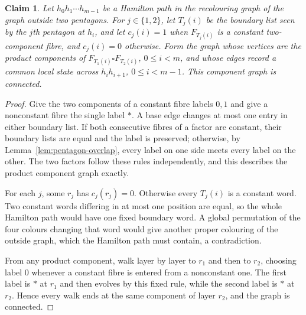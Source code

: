 \documentclass[11pt]{article}
\newtheorem{claim}{Claim}
\theoremstyle{remark}
\numberwithin{equation}{section}
\numberwithin{table}{section}
\begin{document}
\begin{claim}\label{lem:pentagon-component-graph}
Let $h_0h_1\cdots h_{m-1}$ be a Hamilton path in the
recolouring graph of the graph outside two pentagons.  For
$j\in\{1,2\}$, let $T_j(i)$ be the boundary list seen by the $j$th
pentagon at $h_i$, and let $c_j(i)=1$ when $F_{T_j(i)}$ is a constant
two-component fibre, and $c_j(i)=0$ otherwise.  Form the graph whose
vertices are the product components of
$F_{T_1(i)}\square F_{T_2(i)}$, $0\le i<m$, and whose edges record a
common local state across $h_ih_{i+1}$, $0\le i<m-1$.  This component
graph is connected.
\end{claim}
\begin{proof}
Give the two components of a constant fibre labels $0,1$ and give a
nonconstant fibre the single label $\ast$.  A base edge changes at
most one entry in either boundary list.  If both consecutive fibres of
a factor are constant, their boundary lists are equal and the label is
preserved; otherwise, by Lemma~\ref{lem:pentagon-overlap}, every label
on one side meets every label on the other.  The two factors follow
these rules independently, and this describes the product component
graph exactly.

For each $j$, some $r_j$ has $c_j(r_j)=0$.  Otherwise every $T_j(i)$
is a constant word.  Two constant words differing in at most one
position are equal, so the whole Hamilton path would have one fixed
boundary word.  A global permutation of the four colours changing that
word would give another proper colouring of the outside graph, which
the Hamilton path must contain, a contradiction.

From any product component, walk layer by layer to $r_1$ and then to
$r_2$, choosing label $0$ whenever a constant fibre is entered from a
nonconstant one.  The first label is $\ast$ at $r_1$ and then evolves
by this fixed rule, while the second label is $\ast$ at $r_2$.  Hence
every walk ends at the same component of layer $r_2$, and the graph is
connected.
\end{proof}
\end{document}
